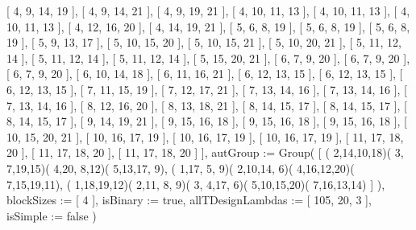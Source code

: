       [ 4, 9, 14, 19 ], [ 4, 9, 14, 21 ], [ 4, 9, 19, 21 ], [ 4, 10, 11, 13 ],
      [ 4, 10, 11, 13 ], [ 4, 10, 11, 13 ], [ 4, 12, 16, 20 ], 
      [ 4, 14, 19, 21 ], [ 5, 6, 8, 19 ], [ 5, 6, 8, 19 ], [ 5, 6, 8, 19 ], 
      [ 5, 9, 13, 17 ], [ 5, 10, 15, 20 ], [ 5, 10, 15, 21 ], 
      [ 5, 10, 20, 21 ], [ 5, 11, 12, 14 ], [ 5, 11, 12, 14 ], 
      [ 5, 11, 12, 14 ], [ 5, 15, 20, 21 ], [ 6, 7, 9, 20 ], [ 6, 7, 9, 20 ], 
      [ 6, 7, 9, 20 ], [ 6, 10, 14, 18 ], [ 6, 11, 16, 21 ], 
      [ 6, 12, 13, 15 ], [ 6, 12, 13, 15 ], [ 6, 12, 13, 15 ], 
      [ 7, 11, 15, 19 ], [ 7, 12, 17, 21 ], [ 7, 13, 14, 16 ], 
      [ 7, 13, 14, 16 ], [ 7, 13, 14, 16 ], [ 8, 12, 16, 20 ], 
      [ 8, 13, 18, 21 ], [ 8, 14, 15, 17 ], [ 8, 14, 15, 17 ], 
      [ 8, 14, 15, 17 ], [ 9, 14, 19, 21 ], [ 9, 15, 16, 18 ], 
      [ 9, 15, 16, 18 ], [ 9, 15, 16, 18 ], [ 10, 15, 20, 21 ], 
      [ 10, 16, 17, 19 ], [ 10, 16, 17, 19 ], [ 10, 16, 17, 19 ], 
      [ 11, 17, 18, 20 ], [ 11, 17, 18, 20 ], [ 11, 17, 18, 20 ] ],
  autGroup := Group( [ ( 2,14,10,18)( 3, 7,19,15)( 4,20, 8,12)( 5,13,17, 9), 
      ( 1,17, 5, 9)( 2,10,14, 6)( 4,16,12,20)( 7,15,19,11), 
      ( 1,18,19,12)( 2,11, 8, 9)( 3, 4,17, 6)( 5,10,15,20)( 7,16,13,14) ] ),
  blockSizes := [ 4 ],
  isBinary := true,
  allTDesignLambdas := [ 105, 20, 3 ],
  isSimple := false )
\endexample
